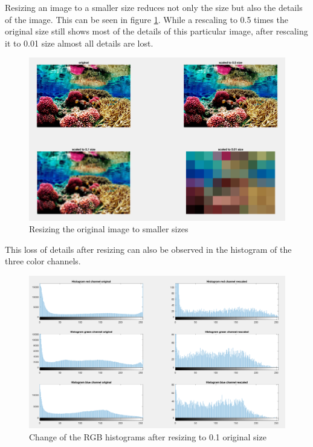 \documentclass[11pt]{article}
\begin{document}
Resizing an image to a smaller size reduces not only the size but also the details of the image. This can be seen in figure \ref{fig:task5}. While a rescaling to 0.5 times the original size still shows most of the details of this particular image, after rescaling it to 0.01 size almost all details are lost.

\begin{figure}[!hbt]
  \includegraphics[width=\textwidth]{task5}
  \caption{Resizing the original image to smaller sizes}
  \label{fig:task5}
\end{figure}

This loss of details after resizing can also be observed in the histogram of the three color channels. 

\begin{figure}[!hbt]
  \includegraphics[width=\textwidth]{task6}
  \caption{Change of the RGB histograms after resizing to 0.1 original size}
  \label{fig:task6}
\end{figure}
\end{document}
